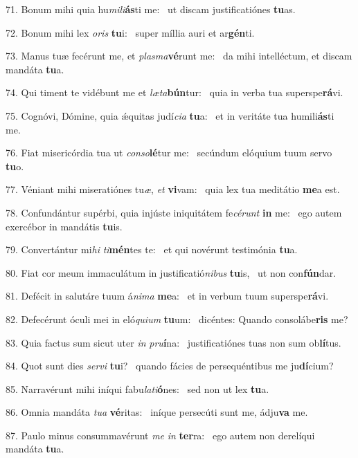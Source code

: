 71. Bonum mihi quia hu\textit{mi}\textit{li}\textbf{ás}ti me: \ast\  ut discam justificatiónes \textbf{tu}as.\

72. Bonum mihi lex \textit{o}\textit{ris} \textbf{tu}i: \ast\  super míllia auri et ar\textbf{gén}ti.\

73. Manus tuæ fecérunt me, et \textit{plas}\textit{ma}\textbf{vé}runt me: \ast\  da mihi intelléctum, et discam mandáta \textbf{tu}a.\

74. Qui timent te vidébunt me et \textit{læ}\textit{ta}\textbf{bún}tur: \ast\  quia in verba tua superspe\textbf{rá}vi.\

75. Cognóvi, Dómine, quia ǽquitas judí\textit{ci}\textit{a} \textbf{tu}a: \ast\  et in veritáte tua humili\textbf{ás}ti me.\

76. Fiat misericórdia tua ut \textit{con}\textit{so}\textbf{lé}tur me: \ast\  secúndum elóquium tuum servo \textbf{tu}o.\

77. Véniant mihi miseratiónes tu\textit{æ}, \textit{et} \textbf{vi}vam: \ast\  quia lex tua meditátio \textbf{me}a est.\

78. Confundántur supérbi, quia injúste iniquitátem fe\textit{cé}\textit{runt} \textbf{in} me: \ast\  ego autem exercébor in mandátis \textbf{tu}is.\

79. Convertántur mi\textit{hi} \textit{ti}\textbf{mén}tes te: \ast\  et qui novérunt testimónia \textbf{tu}a.\

80. Fiat cor meum immaculátum in justificatió\textit{ni}\textit{bus} \textbf{tu}is, \ast\  ut non con\textbf{fún}dar.\

81. Defécit in salutáre tuum á\textit{ni}\textit{ma} \textbf{me}a: \ast\  et in verbum tuum superspe\textbf{rá}vi.\

82. Defecérunt óculi mei in eló\textit{qui}\textit{um} \textbf{tu}um: \ast\  dicéntes: Quando consolábe\textbf{ris} me?\

83. Quia factus sum sicut uter \textit{in} \textit{pru}\textbf{í}na: \ast\  justificatiónes tuas non sum ob\textbf{lí}tus.\

84. Quot sunt dies \textit{ser}\textit{vi} \textbf{tu}i? \ast\  quando fácies de persequéntibus me ju\textbf{dí}cium?\

85. Narravérunt mihi iníqui fabu\textit{la}\textit{ti}\textbf{ó}nes: \ast\  sed non ut lex \textbf{tu}a.\

86. Omnia mandáta \textit{tu}\textit{a} \textbf{vé}ritas: \ast\  iníque persecúti sunt me, ádju\textbf{va} me.\

87. Paulo minus consummavérunt \textit{me} \textit{in} \textbf{ter}ra: \ast\  ego autem non derelíqui mandáta \textbf{tu}a.\


